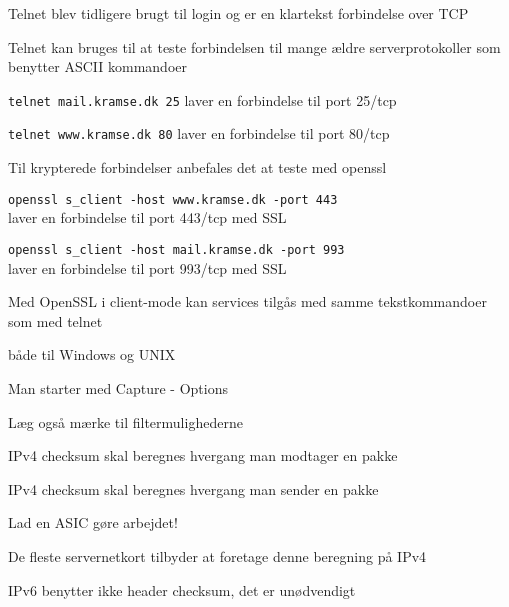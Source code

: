 \documentclass[Screen16to9,17pt]{foils}
\begin{document}

\begin{list1}
\item Telnet blev tidligere brugt til login og er en klartekst forbindelse
over TCP
\item Telnet kan bruges til at teste forbindelsen til mange ældre serverprotokoller som benytter ASCII kommandoer
\begin{list2}
\item \verb+telnet mail.kramse.dk 25+ laver en forbindelse til port 25/tcp
\item \verb+telnet www.kramse.dk 80+ laver en forbindelse til port 80/tcp
\end{list2}
\item Til krypterede forbindelser anbefales det at teste med openssl
\begin{list2}
\item \verb+openssl s_client -host www.kramse.dk -port 443+\\
laver en forbindelse til port 443/tcp med SSL
\item \verb+openssl s_client -host mail.kramse.dk -port 993+\\
 laver en forbindelse til port 993/tcp med SSL
\end{list2}
\item Med OpenSSL i client-mode kan services tilgås med samme tekstkommandoer som med telnet
\end{list1}



\centerline{}
\centerline{både til Windows og UNIX}



\centerline{Man starter med Capture - Options}



\centerline{Læg også mærke til filtermulighederne}


\begin{list1}
\item IPv4 checksum skal beregnes hvergang man modtager en pakke
\item IPv4 checksum skal beregnes hvergang man sender en pakke
\vskip 1cm
\item Lad en ASIC gøre arbejdet!
\item De fleste servernetkort tilbyder at foretage denne beregning på IPv4
\item IPv6 benytter ikke header checksum, det er unødvendigt
\end{list1}
\vskip 1cm
\end{document}
